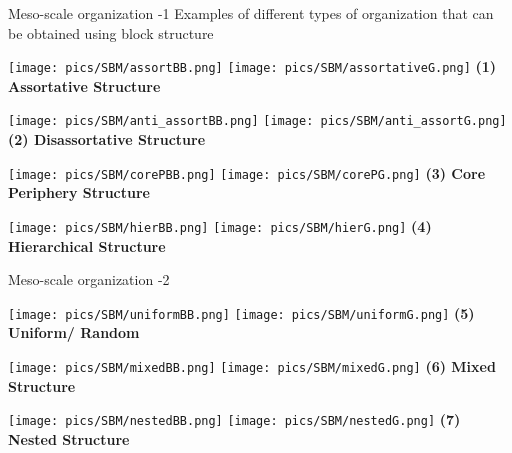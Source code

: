 \begin{textbox}{Meso-scale organization -1}
    Examples of different types of organization that can be obtained using block structure

    \centering

    \texttt{[image: pics/SBM/assortBB.png]}
    \texttt{[image: pics/SBM/assortativeG.png]}
    \textbf{(1) Assortative Structure}

    \texttt{[image: pics/SBM/anti\_assortBB.png]}
    \texttt{[image: pics/SBM/anti\_assortG.png]}
    \textbf{(2) Disassortative Structure}

    \texttt{[image: pics/SBM/corePBB.png]}
    \texttt{[image: pics/SBM/corePG.png]}
    \textbf{(3) Core Periphery Structure}

    \texttt{[image: pics/SBM/hierBB.png]}
    \texttt{[image: pics/SBM/hierG.png]}
    \textbf{(4) Hierarchical Structure}
\end{textbox}


\begin{textbox}{Meso-scale organization -2}
    \centering

    \texttt{[image: pics/SBM/uniformBB.png]}
    \texttt{[image: pics/SBM/uniformG.png]}
    \textbf{(5) Uniform/ Random}

    \texttt{[image: pics/SBM/mixedBB.png]}
    \texttt{[image: pics/SBM/mixedG.png]}
    \textbf{(6) Mixed Structure}

    \texttt{[image: pics/SBM/nestedBB.png]}
    \texttt{[image: pics/SBM/nestedG.png]}
    \textbf{(7) Nested Structure}

\end{textbox}








